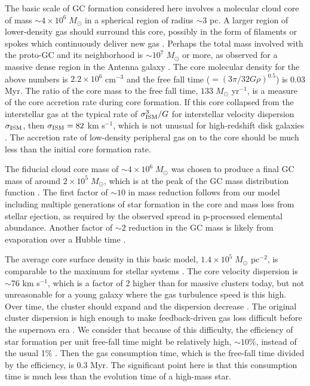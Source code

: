 \documentclass[12pt,preprint]{aastex}
\begin{document}
The basic scale of GC formation considered here involves a molecular cloud core of
mass $\sim4\times10^6\;M_\odot$ in a spherical region of radius $\sim3$ pc. A
larger region of lower-density gas should surround this core, possibly in the form
of filaments or spokes which continuously deliver new gas
\citep{klessen98,myers09}. Perhaps the total mass involved with the proto-GC and
its neighborhood is $\sim10^7\;M_\odot$ or more, as observed for a massive dense
region in the Antenna galaxy \citep{herrera12,johnson15}. The core molecular
density for the above numbers is $2.2\times10^6$ cm$^{-3}$ and the free fall time
($=(3\pi/32 G \rho)^{0.5}$) is 0.03 Myr. The ratio of the core mass to the free
fall time, $133\;M_\odot$ yr$^{-1}$, is a measure of the core accretion rate during
core formation. If this core collapsed from the interstellar gas at the typical
rate of $\sigma_{\rm ISM}^3/G$ for interstellar velocity dispersion $\sigma_{\rm
ISM}$, then $\sigma_{\rm ISM}=82$ km s$^{-1}$, which is not unusual for
high-redshift disk galaxies \citep[e.g.,][]{forster09}. The accretion rate of
low-density peripheral gas on to the core should be much less than the initial core
formation rate.

The fiducial cloud core mass of $\sim4\times10^6\;M_\odot$ was chosen to produce a
final GC mass of around $2\times10^5\;M_\odot$, which is at the peak of the GC mass
distribution function \citep{harris79}.  The first factor of $\sim10$ in mass
reduction follows from our model including multiple generations of star formation
in the core and mass loss from stellar ejection, as required by the observed spread
in p-processed elemental abundance. Another factor of $\sim2$ reduction in the GC
mass is likely from evaporation over a Hubble time \citep{mclaughlin08}.

The average core surface density in this basic model, $1.4\times10^5\;M_\odot$
pc$^{-2}$, is comparable to the maximum for stellar systems
\citep{hopkins10,walker16}.  The core velocity dispersion is $\sim76$ km s$^{-1}$,
which is a factor of 2 higher than for massive clusters today, but not unreasonable
for a young galaxy where the gas turbulence speed is this high. Over time, the
cluster should expand and the dispersion decrease \citep[e.g.][]{gieles16}. The
original cluster dispersion is high enough to make feedback-driven gas loss
difficult before the supernova era \citep{matzner15,krause16}. We consider that
because of this difficulty, the efficiency of star formation per unit free-fall
time might be relatively high, $\sim10$\%, instead of the usual 1\%
\citep{krumholz07}. Then the gas consumption time, which is the free-fall time
divided by the efficiency, is 0.3 Myr. The significant point here is that this
consumption time is much less than the evolution time of a high-mass star.
\end{document}
